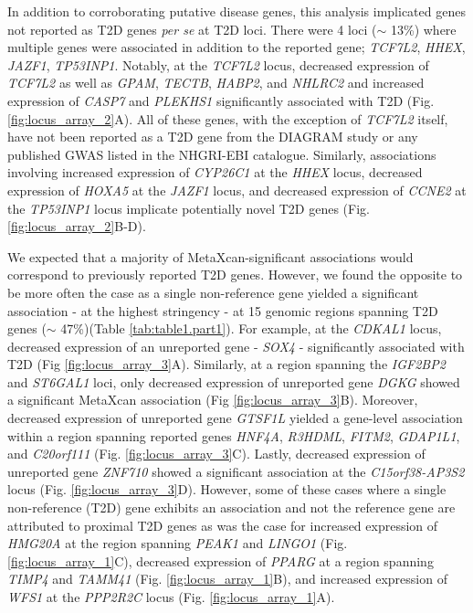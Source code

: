 \documentclass[10pt]{article}
\begin{document}
In addition to corroborating putative disease genes, this analysis implicated genes not reported as T2D genes \textit{per se} at T2D loci. There were 4 loci ($\sim$ 13\%) where multiple genes were associated in addition to the reported gene; \textit{TCF7L2}, \textit{HHEX}, \textit{JAZF1}, \textit{TP53INP1}. Notably, at the \textit{TCF7L2} locus, decreased expression of \textit{TCF7L2} as well as \textit{GPAM}, \textit{TECTB}, \textit{HABP2}, and \textit{NHLRC2} and increased expression of \textit{CASP7} and \textit{PLEKHS1} significantly associated with T2D (Fig. \ref{fig:locus_array_2}A). All of these genes, with the exception of \textit{TCF7L2} itself, have not been reported as a T2D gene from the DIAGRAM study or any published GWAS listed in the NHGRI-EBI catalogue. Similarly, associations involving increased expression of \textit{CYP26C1} at the \textit{HHEX} locus, decreased expression of \textit{HOXA5} at the \textit{JAZF1} locus, and decreased expression of \textit{CCNE2} at the \textit{TP53INP1} locus implicate potentially novel T2D genes (Fig. \ref{fig:locus_array_2}B-D). 

We expected that a majority of MetaXcan-significant associations would correspond to previously reported T2D genes. However, we found the opposite to be more often the case as a single non-reference gene yielded a significant association - at the highest stringency - at 15 genomic regions spanning T2D genes ($\sim$ 47\%)(Table \ref{tab:table1.part1}). For example, at the \textit{CDKAL1} locus, decreased expression of an unreported gene - \textit{SOX4} - significantly associated with T2D (Fig \ref{fig:locus_array_3}A). Similarly, at a region spanning the \textit{IGF2BP2} and \textit{ST6GAL1} loci, only decreased expression of unreported gene \textit{DGKG} showed a significant MetaXcan association (Fig \ref{fig:locus_array_3}B). Moreover, decreased expression of unreported gene \textit{GTSF1L} yielded a gene-level association within a region spanning reported genes \textit{HNF4A}, \textit{R3HDML}, \textit{FITM2}, \textit{GDAP1L1}, and \textit{C20orf111} (Fig. \ref{fig:locus_array_3}C). Lastly, decreased expression of unreported gene \textit{ZNF710} showed a significant association at the \textit{C15orf38-AP3S2} locus (Fig. \ref{fig:locus_array_3}D). However, some of these cases where a single non-reference (T2D) gene exhibits an association and not the reference gene are attributed to proximal T2D genes as was the case for increased expression of \textit{HMG20A} at the region spanning \textit{PEAK1} and \textit{LINGO1} (Fig. \ref{fig:locus_array_1}C), decreased expression of \textit{PPARG} at a region spanning \textit{TIMP4} and \textit{TAMM41} (Fig. \ref{fig:locus_array_1}B), and increased expression of \textit{WFS1} at the \textit{PPP2R2C} locus (Fig. \ref{fig:locus_array_1}A).  
\end{document}

